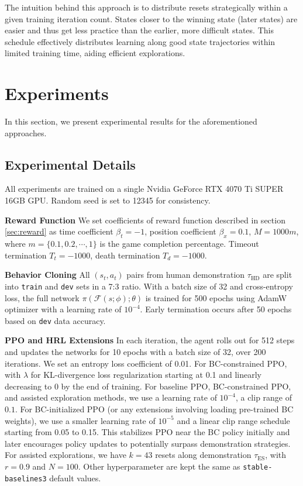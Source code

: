 \documentclass{article}
\begin{document}
The intuition behind this approach is to distribute resets strategically 
within a given training iteration count. States closer to the winning 
state (later states) are easier and thus get less practice than the 
earlier, more difficult states. This schedule effectively distributes 
learning along good state trajectories within limited training time, 
aiding efficient explorations.




\section{Experiments}
In this section, we present experimental results for the aforementioned 
approaches. 

\subsection{Experimental Details}
All experiments are trained on a single Nvidia GeForce RTX 4070 Ti 
SUPER 16GB GPU. Random seed is set to 12345 for consistency.

\textbf{Reward Function} We set coefficients of reward function described
in section \ref{sec:reward} as time coefficient $\beta_t = -1$, 
position coefficient $\beta_x = 0.1$, 
$M=1000m$, where $m=\{0.1, 0.2, \cdots, 1\}$ is the game completion percentage.
Timeout termination $T_t = -1000$, death termination $T_d = -1000$.

\textbf{Behavior Cloning} All $(s_t, a_t)$ 
pairs from human demonstration $\tau_{\text{HD}}$ are split into \texttt{train} and \texttt{dev} sets in a 7:3 ratio. 
With a batch size of 32 and cross-entropy loss, the full network 
$\pi(\mathcal{F}(s; \phi);\theta)$ is trained for 500 epochs using 
AdamW optimizer with a learning rate of $10^{-4}$. Early termination 
occurs after 50 epochs based on \texttt{dev} data accuracy.

\textbf{PPO and HRL Extensions} In each iteration, the agent rolls out for 
512 steps and updates the networks for 10 epochs with a batch size of 32, 
over 200 iterations. We set an entropy loss coefficient of 0.01. For 
BC-constrained PPO, with $\lambda$ for KL-divergence loss regularization 
starting at 0.1 and linearly decreasing to 0 by the end of training.
For baseline PPO, BC-constrained PPO, and assisted exploration methods, we use 
a learning rate of $10^{-4}$, a clip range of $0.1$. For BC-initialized 
PPO (or any extensions involving loading pre-trained BC weights), 
we use a smaller learning rate of $10^{-5}$ and a linear clip 
range schedule starting from 0.05 to 0.15. This stabilizes PPO near the BC 
policy initially and later encourages policy updates to potentially surpass 
demonstration strategies. For assisted explorations, we have $k=43$ resets 
along demonstration $\tau_{\text{ES}}$, with $r=0.9$ and $N=100$.
Other hyperparameter are kept the same as \texttt{stable-baselines3} default values.
\end{document}
